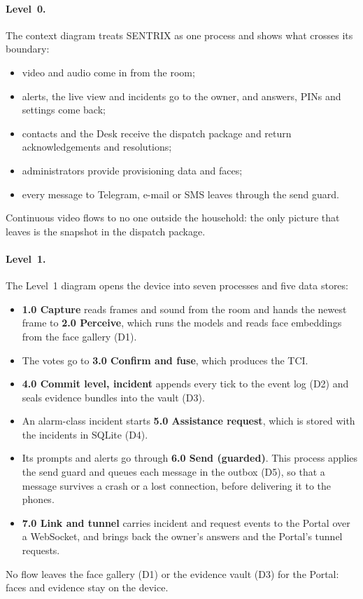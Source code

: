 \paragraph{Level~0.} The context diagram treats SENTRIX as one process and shows what crosses its boundary:
\begin{itemize}
\item video and audio come in from the room;
\item alerts, the live view and incidents go to the owner, and answers, PINs and settings come back;
\item contacts and the Desk receive the dispatch package and return acknowledgements and resolutions;
\item administrators provide provisioning data and faces;
\item every message to Telegram, e-mail or SMS leaves through the send guard.
\end{itemize}
Continuous video flows to no one outside the household: the only picture that leaves is the snapshot in the dispatch package.

\paragraph{Level~1.} The Level~1 diagram opens the device into seven processes and five data stores:
\begin{itemize}
\item \textbf{1.0 Capture} reads frames and sound from the room and hands the newest frame to \textbf{2.0 Perceive}, which runs the models and reads face embeddings from the face gallery (D1).
\item The votes go to \textbf{3.0 Confirm and fuse}, which produces the TCI.
\item \textbf{4.0 Commit level, incident} appends every tick to the event log (D2) and seals evidence bundles into the vault (D3).
\item An alarm-class incident starts \textbf{5.0 Assistance request}, which is stored with the incidents in SQLite (D4).
\item Its prompts and alerts go through \textbf{6.0 Send (guarded)}. This process applies the send guard and queues each message in the outbox (D5), so that a message survives a crash or a lost connection, before delivering it to the phones.
\item \textbf{7.0 Link and tunnel} carries incident and request events to the Portal over a WebSocket, and brings back the owner's answers and the Portal's tunnel requests.
\end{itemize}
No flow leaves the face gallery (D1) or the evidence vault (D3) for the Portal: faces and evidence stay on the device.

